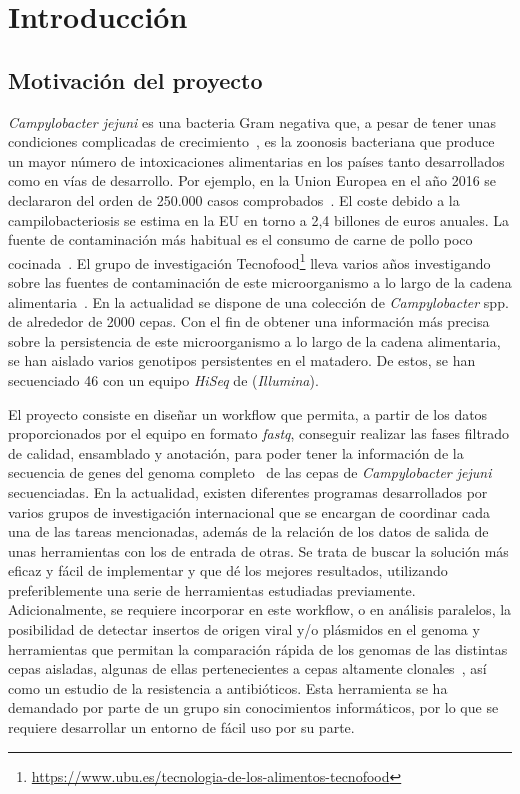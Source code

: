 \chapter{Introducción} 
\label{chap:intro}

\vspace{-0.2cm}

\section{Motivación del proyecto}

\textit{Campylobacter jejuni} es una bacteria Gram negativa que, a pesar de tener unas condiciones complicadas de crecimiento~\cite{garciasanchez2017}, es la zoonosis bacteriana que produce un mayor número de intoxicaciones alimentarias en los países tanto desarrollados como en vías de desarrollo. Por ejemplo, en la Union Europea en el año 2016 se declararon del orden de 250.000 casos comprobados~\cite{report2016}. El coste debido a la campilobacteriosis se estima en la EU en torno a 2,4 billones de euros anuales. La fuente de contaminación más habitual es el consumo de carne de pollo poco cocinada~\cite{GarciaSanchez2018}. El grupo de investigación Tecnofood\footnote{\url{https://www.ubu.es/tecnologia-de-los-alimentos-tecnofood}} lleva varios años investigando sobre las fuentes de contaminación de este microorganismo a lo largo de la cadena alimentaria~\cite{garciasanchez2017, GarciaSanchez2018, Melero2012}. En la actualidad se dispone de una colección de \textit{Campylobacter} spp. de alrededor de 2000 cepas. Con el fin de obtener una información más precisa sobre la persistencia de este microorganismo a lo largo de la cadena alimentaria, se han aislado varios genotipos persistentes en el matadero. De estos, se han secuenciado 46 con un equipo \textit{HiSeq} de (\textit{Illumina}).

El proyecto consiste en diseñar un workflow que permita, a partir de los datos proporcionados por el equipo en formato \textit{fastq}, conseguir realizar las fases filtrado de calidad, ensamblado y anotación, para poder tener la información de la secuencia de genes del genoma completo~\cite{Clark2016, Llarena2017, Zhao2016} de las cepas de \textit{Campylobacter jejuni} secuenciadas. En la actualidad, existen diferentes programas desarrollados por varios grupos de investigación internacional que se encargan de coordinar cada una de las tareas mencionadas, además de la relación de los datos de salida de unas herramientas con los de entrada de otras. Se trata de buscar la solución más eficaz y fácil de implementar y que dé los mejores resultados, utilizando preferiblemente una serie de herramientas estudiadas previamente. Adicionalmente, se requiere incorporar en este workflow, o en análisis paralelos, la posibilidad de detectar insertos de origen viral y/o plásmidos en el genoma y herramientas que permitan la comparación rápida de los genomas de las distintas cepas aisladas, algunas de ellas pertenecientes a cepas altamente clonales~\cite{Skarp2015}, así como un estudio de la resistencia a antibióticos. Esta herramienta se ha demandado por parte de un grupo sin conocimientos informáticos, por lo que se requiere desarrollar un entorno de fácil uso por su parte.

